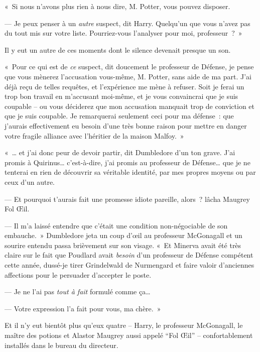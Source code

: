 «~Si nous n'avons plus rien à nous dire, M. Potter, vous pouvez disposer.

--- Je peux penser à un \emph{autre} suspect, dit Harry. Quelqu'un que vous n'avez pas du tout mis sur votre liste. Pourriez-vous l'analyser pour moi, professeur~?~»

Il y eut un autre de ces moments dont le silence devenait presque un son.

«~Pour ce qui est de \emph{ce} suspect, dit doucement le professeur de Défense, je pense que vous mènerez l'accusation vous-même, M. Potter, sans aide de ma part. J'ai déjà reçu de telles requêtes, et l'expérience me mène à refuser. Soit je ferai un trop bon travail en m'accusant moi-même, et je vous convaincrai que je suis coupable -- ou vous déciderez que mon accusation manquait trop de conviction et que je suis coupable. Je remarquerai seulement ceci pour ma défense~: que j'aurais effectivement eu besoin d'une très bonne raison pour mettre en danger votre fragile alliance avec l'héritier de la maison Malfoy.~»


«~… et j'ai donc peur de devoir partir, dit Dumbledore d'un ton grave. J'ai promis à Quirinus… c'est-à-dire, j'ai promis au professeur de Défense… que je ne tenterai en rien de découvrir sa véritable identité, par mes propres moyens ou par ceux d'un autre.

--- Et pourquoi t'aurais fait une promesse idiote pareille, alors~? lâcha Maugrey Fol Œil.

--- Il m'a laissé entendre que c'était une condition non-négociable de son embauche.~» Dumbledore jeta un coup d'œil au professeur McGonagall et un sourire entendu passa brièvement sur son visage. «~Et Minerva avait été très claire sur le fait que Poudlard avait \emph{besoin} d'un professeur de Défense compétent cette année, dussé-je tirer Grindelwald de Nurmengard et faire valoir d'anciennes affections pour le persuader d'accepter le poste.

--- Je ne l'ai pas \emph{tout à fait} formulé comme ça…

--- Votre expression l'a fait pour vous, ma chère.~»

Et il n'y eut bientôt plus qu'eux quatre -- Harry, le professeur McGonagall, le maître des potions et Alastor Maugrey aussi appelé “Fol Œil” -- confortablement installés dans le bureau du directeur.

